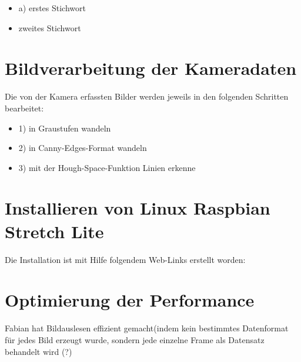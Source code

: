 \documentclass[a4paper,10pt]{article}
\begin{document}
  \begin{itemize}
  \item{a)} erstes Stichwort
  \item zweites Stichwort
  \end{itemize}

  \section{Bildverarbeitung der Kameradaten}
  Die von der Kamera erfassten Bilder werden jeweils in den  folgenden
  Schritten bearbeitet:  \\
  
  \begin{itemize}
  \item{1)} in Graustufen wandeln
  \item{2)} in Canny-Edges-Format wandeln
  \item{3)} mit der Hough-Space-Funktion Linien erkenne
  \end{itemize}


 \section{Installieren von Linux Raspbian Stretch Lite}
  Die Installation ist mit Hilfe folgendem Web-Links erstellt worden:\\
  
 \section{Optimierung der Performance}
  Fabian hat Bildauslesen effizient gemacht(indem kein bestimmtes Datenformat
  für jedes Bild erzeugt wurde, sondern jede einzelne Frame als Datensatz
  behandelt wird (?)\\

	
  
\end{document}
